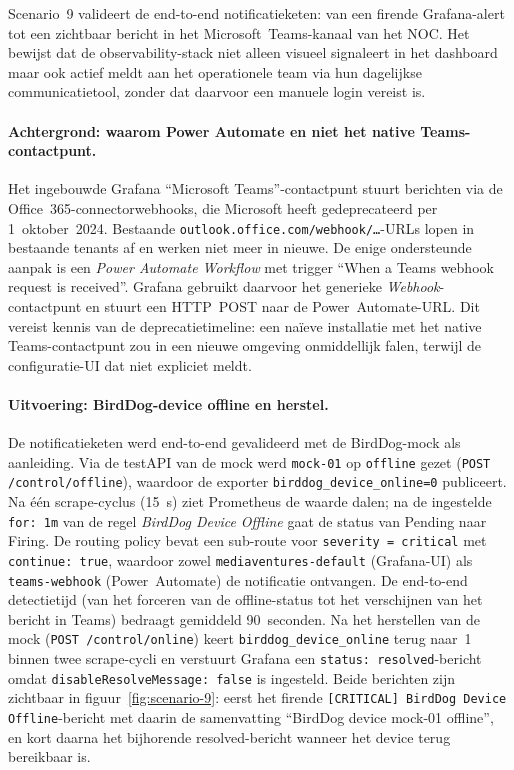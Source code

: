 Scenario~9 valideert de end-to-end notificatieketen: van een firende Grafana-alert tot een zichtbaar bericht in het Microsoft~Teams-kanaal van het NOC. Het bewijst dat de observability-stack niet alleen visueel signaleert in het dashboard maar ook actief meldt aan het operationele team via hun dagelijkse communicatietool, zonder dat daarvoor een manuele login vereist is.

\paragraph{Achtergrond: waarom Power Automate en niet het native Teams-contactpunt.}
Het ingebouwde Grafana ``Microsoft Teams''-contactpunt stuurt berichten via de Office~365-connectorwebhooks, die Microsoft heeft gedeprecateerd per 1~oktober~2024. Bestaande \texttt{out\-look.office.com/webhook/\ldots}-URLs lopen in bestaande tenants af en werken niet meer in nieuwe. De enige ondersteunde aanpak is een \emph{Power Automate Workflow} met trigger ``When a Teams webhook request is received''. Grafana gebruikt daarvoor het generieke \emph{Webhook}-contactpunt en stuurt een HTTP~POST naar de Power~Automate-URL. Dit vereist kennis van de deprecatietimeline: een naïeve installatie met het native Teams-contactpunt zou in een nieuwe omgeving onmiddellijk falen, terwijl de configuratie-UI dat niet expliciet meldt.

\paragraph{Uitvoering: BirdDog-device offline en herstel.}
De notificatieketen werd end-to-end gevalideerd met de BirdDog-mock als aanleiding. Via de testAPI van de mock werd \texttt{mock-01} op \texttt{offline} gezet (\texttt{POST /control/offline}), waardoor de exporter \texttt{birddog\_device\_online=0} publiceert. Na één scrape-cyclus (15~s) ziet Prometheus de waarde dalen; na de ingestelde \texttt{for:~1m} van de regel \emph{BirdDog Device Offline} gaat de status van Pending naar Firing. De routing policy bevat een sub-route voor \texttt{severity~=~critical} met \texttt{continue:~true}, waardoor zowel \texttt{mediaventures-default} (Grafana-UI) als \texttt{teams-webhook} (Power~Automate) de notificatie ontvangen. De end-to-end detectietijd (van het forceren van de offline-status tot het verschijnen van het bericht in Teams) bedraagt gemiddeld 90~seconden. Na het herstellen van de mock (\texttt{POST /control/online}) keert \texttt{birddog\_device\_online} terug naar~1 binnen twee scrape-cycli en verstuurt Grafana een \texttt{status:~resolved}-bericht omdat \texttt{disableResolveMessage:~false} is ingesteld. Beide berichten zijn zichtbaar in figuur~\ref{fig:scenario-9}: eerst het firende \texttt{[CRITICAL] BirdDog Device Offline}-bericht met daarin de samenvatting ``BirdDog device mock-01 offline'', en kort daarna het bijhorende resolved-bericht wanneer het device terug bereikbaar is.

